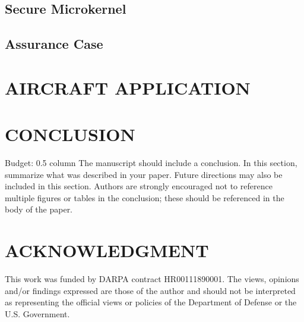 \documentclass{IEEEcsmag}
\begin{document}
\subsection{Secure Microkernel}


\subsection{Assurance Case}


\section{AIRCRAFT APPLICATION}



\section{CONCLUSION}
 Budget: 0.5 column
The manuscript should include a conclusion. In this section, summarize what was described in your paper. Future directions may also be included in this section. Authors are strongly encouraged not to reference multiple figures or tables in the conclusion; these should be referenced in the body of the paper.

\section{ACKNOWLEDGMENT}

This work was funded by DARPA contract HR00111890001. The
views, opinions and/or findings expressed are those of the author
and should not be interpreted as representing the official views or
policies of the Department of Defense or the U.S. Government.





\end{document}
